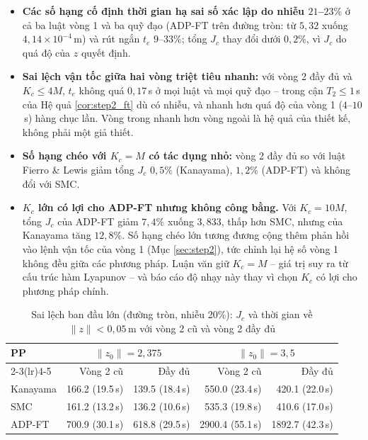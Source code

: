 \documentclass[12pt,a4paper]{article}
\begin{document}
\begin{itemize}
    \item \textbf{Các số hạng cố định thời gian hạ sai số xác lập do nhiễu $21$--$23\%$} ở cả ba luật vòng 1 và ba quỹ đạo (ADP-FT trên đường tròn: từ $5{,}32$ xuống $4{,}14\times10^{-4}$\,m) và rút ngắn $t_e$ $9$--$33\%$; tổng $J_c$ thay đổi dưới $0{,}2\%$, vì $J_c$ do quá độ của $z$ quyết định.
    \item \textbf{Sai lệch vận tốc giữa hai vòng triệt tiêu nhanh:} với vòng 2 đầy đủ và $K_c \leq 4M$, $t_e$ không quá $0{,}17$\,s ở mọi luật và mọi quỹ đạo -- trong cận $T_2 \leq 1$\,s của Hệ quả \ref{cor:step2_ft} dù có nhiễu, và nhanh hơn quá độ của vòng 1 ($4$--$10$\,s) hàng chục lần. Vòng trong nhanh hơn vòng ngoài là hệ quả của thiết kế, không phải một giả thiết.
    \item \textbf{Số hạng chéo với $K_c = M$ có tác dụng nhỏ:} vòng 2 đầy đủ so với luật Fierro \& Lewis giảm tổng $J_c$ $0{,}5\%$ (Kanayama), $1{,}2\%$ (ADP-FT) và không đổi với SMC.
    \item \textbf{$K_c$ lớn có lợi cho ADP-FT nhưng không công bằng.} Với $K_c = 10M$, tổng $J_c$ của ADP-FT giảm $7{,}4\%$ xuống $3{,}833$, thấp hơn SMC, nhưng của Kanayama tăng $12{,}8\%$. Số hạng chéo lớn tương đương cộng thêm phản hồi vào lệnh vận tốc của vòng 1 (Mục \ref{sec:step2}), tức chỉnh lại hệ số vòng 1 không đều giữa các phương pháp. Luận văn giữ $K_c = M$ -- giá trị suy ra từ cấu trúc hàm Lyapunov -- và báo cáo độ nhạy này thay vì chọn $K_c$ có lợi cho phương pháp chính.
\end{itemize}

\begin{table}[H]
\centering
\caption{Sai lệch ban đầu lớn (đường tròn, nhiễu 20\%): $J_c$ và thời gian về $\|z\| < 0{,}05$\,m với vòng 2 cũ và vòng 2 đầy đủ}
\label{tab:step2_z0}
\small
\begin{tabular}{lrrrr}
\toprule
\multirow{2}{*}{\textbf{PP}} & \multicolumn{2}{c}{$\|z_0\| = 2{,}375$} & \multicolumn{2}{c}{$\|z_0\| = 3{,}5$} \\
\cmidrule(lr){2-3}\cmidrule(lr){4-5}
 & Vòng 2 cũ & Đầy đủ & Vòng 2 cũ & Đầy đủ \\
\midrule
Kanayama & 166.2 (19.5\,s) & 139.5 (18.4\,s) & 550.0 (23.4\,s) & 420.1 (22.0\,s) \\
SMC & 161.2 (13.2\,s) & 136.2 (10.6\,s) & 535.3 (19.8\,s) & 410.6 (17.0\,s) \\
ADP-FT & 700.9 (30.1\,s) & 618.8 (29.5\,s) & 2900.4 (55.1\,s) & 1892.7 (42.3\,s) \\
\bottomrule
\end{tabular}
\end{table}
\end{document}
